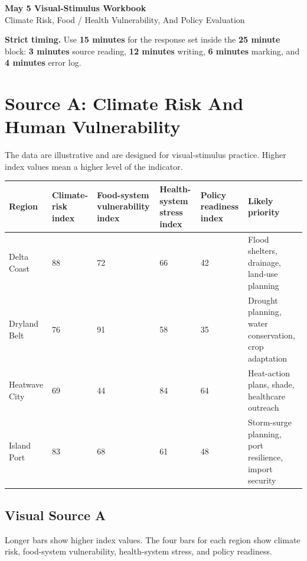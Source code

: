 \documentclass[11pt,a4paper]{article}
\newcommand{\term}[1]{\textcolor{HeadingBlue}{\textbf{#1}}}
\newcommand{\boxnote}[3]{%
\noindent\colorbox{#1}{%
  \begin{minipage}{0.965\textwidth}
  \sffamily
  \textbf{\textcolor{HeadingBlue}{#2}} #3
  \end{minipage}
}}
\begin{document}
\begin{center}
  {\sffamily\bfseries\color{HeadingBlue}\LARGE May 5 Visual-Stimulus Workbook}\\[0.25em]
  {\sffamily\color{AccentTeal}\large Climate Risk, Food / Health Vulnerability, And Policy Evaluation}
\end{center}

\boxnote{SoftBlue}{Strict timing.}{Use \term{15 minutes} for the response set
inside the \term{25 minute} block: \term{3 minutes} source reading,
\term{12 minutes} writing, \term{6 minutes} marking, and \term{4 minutes}
error log.}

\section{Source A: Climate Risk And Human Vulnerability}

The data are illustrative and are designed for visual-stimulus practice. Higher
index values mean a higher level of the indicator.

\begin{tabularx}{\textwidth}{L{0.18\textwidth}C{0.14\textwidth}C{0.14\textwidth}C{0.14\textwidth}C{0.15\textwidth}Y}
\toprule
\textbf{Region} & \textbf{Climate-risk index} & \textbf{Food-system vulnerability index} &
\textbf{Health-system stress index} & \textbf{Policy readiness index} &
\textbf{Likely priority} \\
\midrule
Delta Coast & 88 & 72 & 66 & 42 & Flood shelters, drainage, land-use planning \\
Dryland Belt & 76 & 91 & 58 & 35 & Drought planning, water conservation, crop adaptation \\
Heatwave City & 69 & 44 & 84 & 64 & Heat-action plans, shade, healthcare outreach \\
Island Port & 83 & 68 & 61 & 48 & Storm-surge planning, port resilience, import security \\
\bottomrule
\end{tabularx}

\subsection{Visual Source A}

Longer bars show higher index values. The four bars for each region show
climate risk, food-system vulnerability, health-system stress, and policy
readiness.
\end{document}
